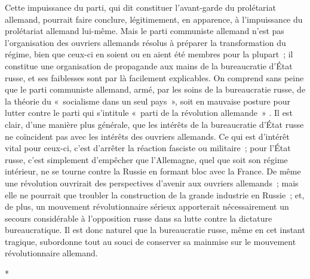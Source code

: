 \documentclass[french,twoside]{book} %
\begin{document}
\noindent Cette impuissance du parti, qui dit constituer l'avant-garde du prolétariat allemand, pourrait faire conclure, légitimement, en apparence, à l'impuissance du prolétariat allemand lui-même. Mais le parti communiste allemand n'est pas l'organisation des ouvriers allemands résolus à préparer la transformation du régime, bien que ceux-ci en soient ou en aient été membres pour la plu­part ; il constitue une organisation de propagande aux mains de la bureaucratie d'État russe, et ses faiblesses sont par là facilement explicables. On comprend sans peine que le parti communiste allemand, armé, par les soins de la bureaucratie russe, de la théorie du « socialisme dans un seul pays », soit en mauvaise posture pour lutter contre le parti qui s'intitule « parti de la révolu­tion allemande » . Il est clair, d'une manière plus générale, que les intérêts de la bureaucratie d'État russe ne coïncident pas avec les intérêts des ouvriers allemands. Ce qui est d'intérêt vital pour ceux-ci, c'est d'arrêter la réaction fasciste ou militaire ; pour l'État russe, c'est simplement d'empêcher que l'Allemagne, quel que soit son régime intérieur, ne se tourne contre la Russie en formant bloc avec la France. De même une révolution ouvrirait des pers­pectives d'avenir aux ouvriers allemands ; mais elle ne pourrait que troubler la construction de la grande industrie en Russie ; et, de plus, un mouvement révolutionnaire sérieux apporterait nécessairement un secours considérable à l'opposition russe dans sa lutte contre la dictature bureaucratique. Il est donc naturel que la bureaucratie russe, même en cet instant tragique, subordonne tout au souci de conserver sa mainmise sur le mouvement révolutionnaire allemand.\par

\begin{center}
\noindent \centerline{*}\par
\end{center}
\end{document}

